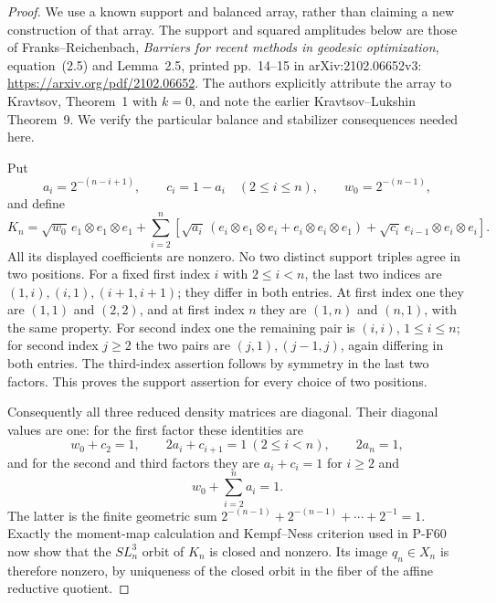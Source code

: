 \begin{proof}
We use a known support and balanced array, rather than
claiming a new construction of that array.  The support
and squared amplitudes below are those of
Franks--Reichenbach, \emph{Barriers for recent methods in
geodesic optimization}, equation~(2.5) and Lemma~2.5,
printed pp.~14--15 in arXiv:2102.06652v3:
\url{https://arxiv.org/pdf/2102.06652}.
The authors explicitly attribute the array to Kravtsov,
Theorem~1 with $k=0$, and note the earlier
Kravtsov--Lukshin Theorem~9.  We verify the particular
balance and stabilizer consequences needed here.

Put
\[
 a_i=2^{-(n-i+1)},\qquad c_i=1-a_i\quad(2\le i\le n),
 \qquad w_0=2^{-(n-1)},
                                                        \tag{P-F64a}
\]
and define
\[
 K_n=\sqrt{w_0}\,e_1\otimes e_1\otimes e_1
 +\sum_{i=2}^n\left[
 \sqrt{a_i}\,(e_i\otimes e_1\otimes e_i
                    +e_i\otimes e_i\otimes e_1)
 +\sqrt{c_i}\,e_{i-1}\otimes e_i\otimes e_i\right].
                                                        \tag{P-F64b}
\]
All its displayed coefficients are nonzero.
No two distinct support triples agree in two positions.
For a fixed first index $i$ with $2\le i<n$, the last
two indices are $(1,i),(i,1),(i+1,i+1)$; they differ
in both entries.  At first index one they are $(1,1)$
and $(2,2)$, and at first index $n$ they are $(1,n)$
and $(n,1)$, with the same property.
For second index one the remaining pair is $(i,i)$,
$1\le i\le n$; for second index $j\ge2$ the two pairs
are $(j,1),(j-1,j)$, again differing in both entries.
The third-index assertion follows by symmetry in the
last two factors.  This proves the support assertion
for every choice of two positions.

Consequently all three reduced density matrices are
diagonal.  Their diagonal values are one: for the
first factor these identities are
\[
 w_0+c_2=1,\qquad 2a_i+c_{i+1}=1\ (2\le i<n),
                      \qquad 2a_n=1,
                                                        \tag{P-F64c}
\]
and for the second and third factors they are
$a_i+c_i=1$ for $i\ge2$ and
\[
              w_0+\sum_{i=2}^n a_i=1.
                                                        \tag{P-F64d}
\]
The latter is the finite geometric sum
$2^{-(n-1)}+2^{-(n-1)}+\cdots+2^{-1}=1$.
Exactly the moment-map calculation and Kempf--Ness
criterion used in P-F60 now show that the
$SL_n^3$ orbit of $K_n$ is closed and nonzero.
Its image $q_n\in X_n$ is therefore nonzero, by
uniqueness of the closed orbit in the fiber of the
affine reductive quotient.


\end{proof}

